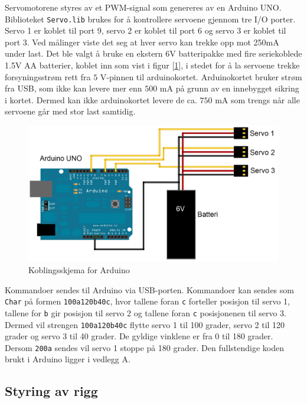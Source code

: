 Servomotorene styres av et PWM-signal som genereres av en Arduino UNO. Biblioteket \texttt{Servo.lib} \cite{ServoLib} brukes for å kontrollere servoene gjennom tre I/O porter. Servo 1 er koblet til port 9, servo 2 er koblet til port 6 og servo 3 er koblet til port 3. Ved målinger viste det seg at hver servo kan trekke opp mot 250mA under last. Det ble valgt å bruke en ekstern 6V batteripakke med fire seriekoblede 1.5V AA batterier, koblet inn som vist i figur [\ref{fig:ArduSkjem}], i stedet for å la servoene trekke forsyningsstrøm rett fra $5$ V-pinnen til arduinokortet. Arduinokortet bruker strøm fra USB, som ikke kan levere mer enn $500$ mA på grunn av en innebygget sikring i kortet. Dermed kan ikke arduinokortet levere de ca. $750$ mA som trengs når alle servoene går med stor last samtidig.

\begin{figure}[h!]
	\centering
	\includegraphics[scale=0.25]{img/KoblingsskjemaArduino.png}
	\caption{Koblingsskjema for Arduino}
	\label{fig:ArduSkjem}
\end{figure}  

Kommandoer sendes til Arduino via USB-porten. Kommandoer kan sendes som \texttt{Char} på formen \texttt{100a120b40c}, hvor tallene foran \texttt{c} forteller posisjon til servo 1, tallene for \texttt{b} gir posisjon til servo 2 og tallene foran \texttt{c} posisjonenen til servo 3. Dermed vil strengen \texttt{100a120b40c} flytte servo 1 til 100 grader, servo 2 til 120 grader og servo 3 til 40 grader. De gyldige vinklene er fra 0 til 180 grader. Dersom \texttt{200a} sendes vil servo 1 stoppe på 180 grader. Den fullstendige koden brukt i Arduino ligger i vedlegg A.

\subsection{Styring av rigg}

